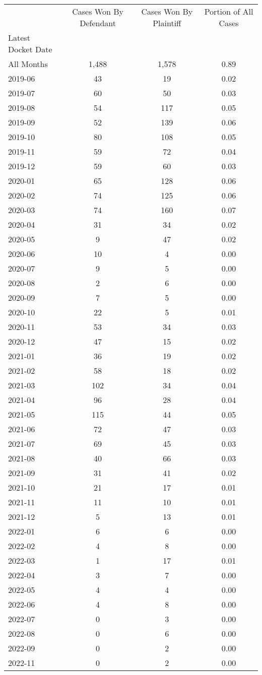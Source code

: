 \begin{tabular}{lccc}
\toprule
 & Cases Won By Defendant & Cases Won By Plaintiff & Portion of All Cases \\
Latest Docket Date &  &  &  \\
\midrule
All Months & 1,488 & 1,578 & 0.89 \\
2019-06 & 43 & 19 & 0.02 \\
2019-07 & 60 & 50 & 0.03 \\
2019-08 & 54 & 117 & 0.05 \\
2019-09 & 52 & 139 & 0.06 \\
2019-10 & 80 & 108 & 0.05 \\
2019-11 & 59 & 72 & 0.04 \\
2019-12 & 59 & 60 & 0.03 \\
2020-01 & 65 & 128 & 0.06 \\
2020-02 & 74 & 125 & 0.06 \\
2020-03 & 74 & 160 & 0.07 \\
2020-04 & 31 & 34 & 0.02 \\
2020-05 & 9 & 47 & 0.02 \\
2020-06 & 10 & 4 & 0.00 \\
2020-07 & 9 & 5 & 0.00 \\
2020-08 & 2 & 6 & 0.00 \\
2020-09 & 7 & 5 & 0.00 \\
2020-10 & 22 & 5 & 0.01 \\
2020-11 & 53 & 34 & 0.03 \\
2020-12 & 47 & 15 & 0.02 \\
2021-01 & 36 & 19 & 0.02 \\
2021-02 & 58 & 18 & 0.02 \\
2021-03 & 102 & 34 & 0.04 \\
2021-04 & 96 & 28 & 0.04 \\
2021-05 & 115 & 44 & 0.05 \\
2021-06 & 72 & 47 & 0.03 \\
2021-07 & 69 & 45 & 0.03 \\
2021-08 & 40 & 66 & 0.03 \\
2021-09 & 31 & 41 & 0.02 \\
2021-10 & 21 & 17 & 0.01 \\
2021-11 & 11 & 10 & 0.01 \\
2021-12 & 5 & 13 & 0.01 \\
2022-01 & 6 & 6 & 0.00 \\
2022-02 & 4 & 8 & 0.00 \\
2022-03 & 1 & 17 & 0.01 \\
2022-04 & 3 & 7 & 0.00 \\
2022-05 & 4 & 4 & 0.00 \\
2022-06 & 4 & 8 & 0.00 \\
2022-07 & 0 & 3 & 0.00 \\
2022-08 & 0 & 6 & 0.00 \\
2022-09 & 0 & 2 & 0.00 \\
2022-11 & 0 & 2 & 0.00 \\
\bottomrule
\end{tabular}
